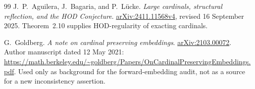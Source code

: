 \documentclass[11pt,letterpaper]{article}
\theoremstyle{definition}
\newcommand{\arxiv}[1]{\href{https://arxiv.org/abs/#1}{arXiv:#1}}
\begin{document}
\begin{thebibliography}{99}
J.~P.~Aguilera, J.~Bagaria, and P.~L\"ucke.
\emph{Large cardinals, structural reflection, and the HOD Conjecture}.
\arxiv{2411.11568v4}, revised 16 September 2025.
Theorem~2.10 supplies HOD-regularity of exacting cardinals.

G.~Goldberg. \emph{A note on cardinal preserving embeddings}.
\arxiv{2103.00072}.
Author manuscript dated 12 May 2021:
\url{https://math.berkeley.edu/~goldberg/Papers/OnCardinalPreservingEmbeddings.pdf}.
Used only as background for the forward-embedding audit, not as a source for a new inconsistency assertion.

\end{thebibliography}
\end{document}
